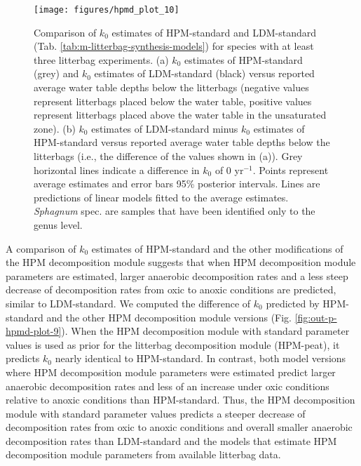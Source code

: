 \documentclass[esd, manuscript]{copernicus}
\begin{document}
\begin{figure}[H]

{\centering \texttt{[image: figures/hpmd\_plot\_10]} 

}

\caption{Comparison of \(k_0\) estimates of HPM-standard and LDM-standard (Tab. \ref{tab:m-litterbag-synthesis-models}) for species with at least three litterbag experiments. (a) \(k_0\) estimates of HPM-standard (grey) and \(k_0\) estimates of LDM-standard (black) versus reported average water table depths below the litterbags (negative values represent litterbags placed below the water table, positive values represent litterbags placed above the water table in the unsaturated zone). (b) \(k_0\) estimates of LDM-standard minus \(k_0\) estimates of HPM-standard versus reported average water table depths below the litterbags (i.e., the difference of the values shown in (a)). Grey horizontal lines indicate a difference in \(k_0\) of 0 yr\(^{-1}\). Points represent average estimates and error bars 95\% posterior intervals. Lines are predictions of linear models fitted to the average estimates. \emph{Sphagnum} spec. are samples that have been identified only to the genus level.}\label{fig:out-p-hpm-mm27-2-mm29-1-mm30-1-p2}
\end{figure}

A comparison of \(k_0\) estimates of HPM-standard and the other modifications of the HPM decomposition module suggests that when HPM decomposition module parameters are estimated, larger anaerobic decomposition rates and a less steep decrease of decomposition rates from oxic to anoxic conditions are predicted, similar to LDM-standard. We computed the difference of \(k_0\) predicted by HPM-standard and the other HPM decomposition module versions (Fig. \ref{fig:out-p-hpmd-plot-9}). When the HPM decomposition module with standard parameter values is used as prior for the litterbag decomposition module (HPM-peat), it predicts \(k_0\) nearly identical to HPM-standard. In contrast, both model versions where HPM decomposition module parameters were estimated predict larger anaerobic decomposition rates and less of an increase under oxic conditions relative to anoxic conditions than HPM-standard. Thus, the HPM decomposition module with standard parameter values predicts a steeper decrease of decomposition rates from oxic to anoxic conditions and overall smaller anaerobic decomposition rates than LDM-standard and the models that estimate HPM decomposition module parameters from available litterbag data.
\end{document}
